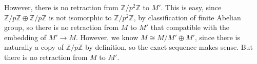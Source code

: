 \documentclass[lang=en,11pt,a4paper,citestyle =authoryear]{elegantpaper}
\begin{document}
However, there is no retraction from $\mathbb Z/p^2\mathbb Z$ to $M'$. This is easy, since $\mathbb Z/p\mathbb Z\oplus \mathbb Z/p\mathbb Z$ is not isomorphic to $\mathbb Z/p^2\mathbb Z$, by classification of finite Abelian group, so there is no retraction from $M$ to $M'$ that compatible with the embedding of $M'\rightarrow M$.
However, we know $M\cong M/M'\oplus M'$, since there is naturally a copy of $\mathbb Z/p\mathbb Z$ by definition, so the exact sequence makes sense. But there is no retraction from $M$ to $M'$.
\par 
\vspace{0.5em}



\addappheadtotoc
\end{document}
